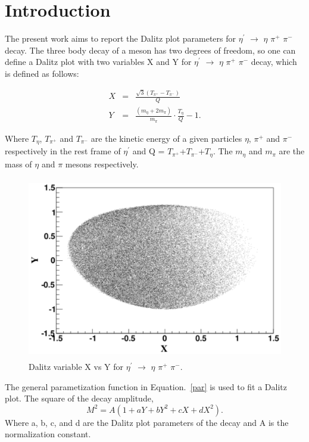 \section{Introduction}

The present work aims to report the Dalitz plot parameters for $\eta^{\prime}$ $\rightarrow$ $\eta$ $\pi^{+}$ $\pi^{-}$ decay. The three body decay of a meson has two degrees of freedom, so one can define a Dalitz plot with two variables X and Y for $\eta^{\prime}$ $\rightarrow$ $\eta$ $\pi^{+}$ $\pi^{-}$ decay, which is defined as follows:

\begin{eqnarray}
X&=&\frac{\sqrt{3}(T_{\pi^{+}} -T_{\pi^{-}})}{Q} \\ 
Y&=&\frac{(m_{\eta}+2m_{\pi})}{m_{\pi} }\cdot \frac{T_{\eta}}{Q} - 1.
\end{eqnarray}

Where $T_{\eta}$, $T_{\pi^{+}}$ and $T_{\pi^{-}}$ are the kinetic energy of a given particles $\eta$, $\pi^{+}$ and $\pi^{-}$ respectively in the rest frame of $\eta^{\prime}$ and Q = $T_{\pi^{+}}$+$T_{\pi^{-}}$+$T_{\eta}$. The $m_{\eta}$ and $m_{\pi}$ are the mass of  $\eta$ and $\pi$ mesons respectively. 

\begin{figure}[ht!]
\centerline{
\includegraphics[width=12cm,height=8cm]{dalitzEtaPrime.pdf}}
\caption{Dalitz variable X vs Y for $\eta^{\prime}$ $\rightarrow$ $\eta$ $\pi^{+}$ $\pi^{-}$.}
\label{DP}
\end{figure}

The general parametization function in Equation.~\ref{par} is used to fit a Dalitz plot. The square of the decay amplitude,
 \begin{equation}
M^{2}=A(1+aY+bY^{2}+cX+dX^{2}).
\label{par}
\end{equation}
Where a, b, c, and d are the Dalitz plot parameters of the decay and A is the normalization constant.

